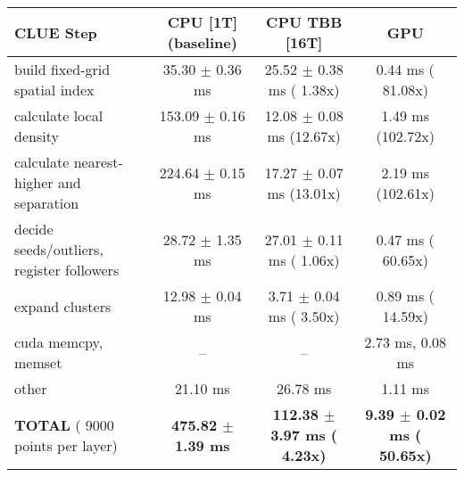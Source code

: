     \begin{tabular}{l|c|c|c}
    \hline
    CLUE Step                                 & CPU [1T] (baseline)         & CPU TBB [16T]                         & GPU                       \\ \hline
    build fixed-grid spatial index            &  35.30 $\pm$  0.36 ms       &  25.52 $\pm$  0.38 ms ( 1.38x)        &   0.44 ms ( 81.08x)       \\
    calculate local density                   & 153.09 $\pm$  0.16 ms       &  12.08 $\pm$  0.08 ms (12.67x)        &   1.49 ms (102.72x)       \\
    calculate nearest-higher and separation   & 224.64 $\pm$  0.15 ms       &  17.27 $\pm$  0.07 ms (13.01x)        &   2.19 ms (102.61x)       \\
    decide seeds/outliers, register followers &  28.72 $\pm$  1.35 ms       &  27.01 $\pm$  0.11 ms ( 1.06x)        &   0.47 ms ( 60.65x)       \\
    expand clusters                           &  12.98 $\pm$  0.04 ms       &   3.71 $\pm$  0.04 ms ( 3.50x)        &   0.89 ms ( 14.59x)       \\ \hline
    cuda memcpy, memset                       & --                          & --                                    &   2.73 ms,   0.08 ms      \\ 
    other                                     &  21.10 ms                   &  26.78 ms                             &   1.11 ms                 \\ \hline
    \textbf{TOTAL} ( 9000 points per layer)   & \textbf{475.82 $\pm$  1.39 ms} & \textbf{112.38 $\pm$  3.97 ms ( 4.23x)} & \textbf{  9.39 $\pm$  0.02 ms ( 50.65x)}  \\
    \hline 
    \end{tabular}
    \linebreak


